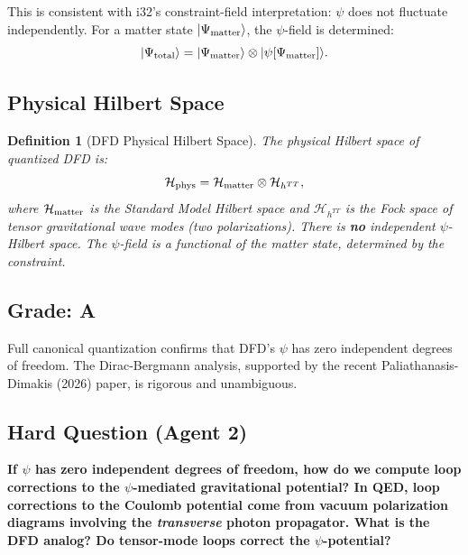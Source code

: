 \documentclass[11pt,a4paper]{article}
\newtheorem{definition}{Definition}
\begin{document}
This is consistent with i32's constraint-field interpretation: $\psi$ does not fluctuate independently. For a matter state $|\Psi_{\rm matter}\rangle$, the $\psi$-field is determined:
\begin{equation}
|\Psi_{\rm total}\rangle = |\Psi_{\rm matter}\rangle \otimes |\psi[\Psi_{\rm matter}]\rangle.
\end{equation}

\subsection{Physical Hilbert Space}

\begin{definition}[DFD Physical Hilbert Space]
The physical Hilbert space of quantized DFD is:
\begin{equation}
\mathcal{H}_{\rm phys} = \mathcal{H}_{\rm matter} \otimes \mathcal{H}_{h^{TT}},
\end{equation}
where $\mathcal{H}_{\rm matter}$ is the Standard Model Hilbert space and $\mathcal{H}_{h^{TT}}$ is the Fock space of tensor gravitational wave modes (two polarizations). There is \textbf{no} independent $\psi$-Hilbert space. The $\psi$-field is a functional of the matter state, determined by the constraint.
\end{definition}

\subsection{Grade: A}

Full canonical quantization confirms that DFD's $\psi$ has zero independent degrees of freedom. The Dirac-Bergmann analysis, supported by the recent Paliathanasis-Dimakis (2026) paper, is rigorous and unambiguous.

\subsection{Hard Question (Agent 2)}

\textbf{If $\psi$ has zero independent degrees of freedom, how do we compute loop corrections to the $\psi$-mediated gravitational potential? In QED, loop corrections to the Coulomb potential come from vacuum polarization diagrams involving the \emph{transverse} photon propagator. What is the DFD analog? Do tensor-mode loops correct the $\psi$-potential?}

\newpage

\end{document}
